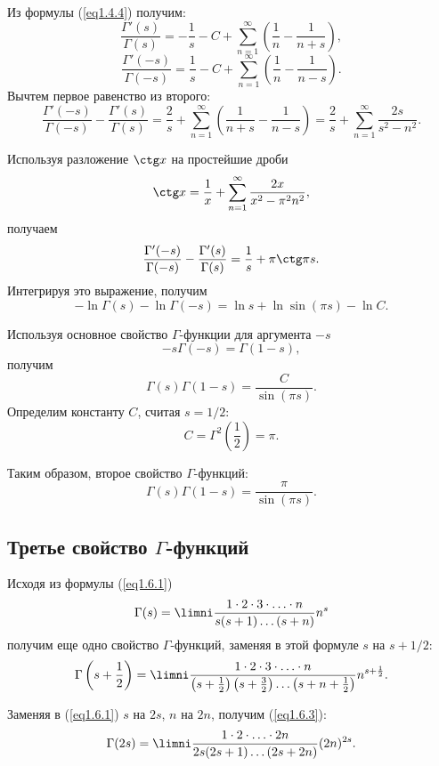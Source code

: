 Из формулы (\ref{eq1.4.4}) получим:
\[
    \frac{\Gamma'(s)}{\Gamma(s)} = -\frac{1}{s} - C + \sum\limits_{n=1}^\infty
    \left(\frac{1}{n} - \frac{1}{n+s}\right),
\]
\[
    \frac{\Gamma'(-s)}{\Gamma(-s)} = \frac{1}{s} - C + \sum\limits_{n=1}^\infty
    \left(\frac{1}{n} - \frac{1}{n-s}\right).
\]
Вычтем первое равенство из второго:
\[
    \frac{\Gamma'(-s)}{\Gamma(-s)} - \frac{\Gamma'(s)}{\Gamma(s)} =
    \frac{2}{s} + \sum\limits_{n=1}^\infty \left(\frac{1}{n+s} -
    \frac{1}{n-s}\right) = 
    \frac{2}{s} + \sum\limits_{n=1}^\infty \frac{2s}{s^2 - n^2}.
\]

Используя разложение \( \ctg x \) на простейшие дроби
\[
    \ctg x = \frac{1}{x} + \sum\limits_{n=1}^\infty \frac{2x}{x^2 - \pi^2n^2},
\]
получаем
\[
    \frac{\Gamma'(-s)}{\Gamma(-s)} - \frac{\Gamma'(s)}{\Gamma(s)} =
    \frac{1}{s} + \pi\ctg\pi s.
\]
Интегрируя это выражение, получим
\[
    -\ln\Gamma(s) - \ln\Gamma(-s) = \ln s + \ln\sin(\pi s) - \ln C.
\]

Используя основное свойство \( \Gamma \)-функции для аргумента \( -s \)
\[
    -s\Gamma(-s) = \Gamma(1-s),
\]
получим
\[
    \Gamma(s)\Gamma(1-s) = \frac{C}{\sin(\pi s)}.
\]
Определим константу \( C \), считая \( s = 1/2 \):
\[
    C = \Gamma^2\left(\frac{1}{2}\right) = \pi.
\]

Таким образом, второе свойство \( \Gamma \)-функций:
\begin{equation}
   \Gamma(s)\Gamma(1-s) = \frac{\pi}{\sin(\pi s)}.
   \label{eq1.5.1}
\end{equation}

\subsection{Третье свойство \( \Gamma \)-функций}

Исходя из формулы (\ref{eq1.6.1})
\begin{equation}
    \Gamma(s) =
    \limni\frac{1\cdot2\cdot3\cdot\ldots\cdot n}{s(s+1)\ldots(s+n)} n^s
    \label{eq1.6.1}
\end{equation}
получим еще одно свойство \( \Gamma \)-функций, заменяя в этой формуле \( s \)
на \( s + 1/2 \):
\begin{equation}
    \Gamma\left(s+\frac{1}{2}\right) =
    \limni\frac{1\cdot2\cdot3\cdot\ldots\cdot n}{
    \left(s + \frac{1}{2}\right) \left(s + \frac{3}{2}\right) \ldots
    \left(s + n + \frac{1}{2}\right)} n^{s+\frac{1}{2}}.
    \label{eq1.6.2}
\end{equation}

Заменяя в (\ref{eq1.6.1}) \( s \) на \( 2s \), \( n \) на \( 2n \), получим
(\ref{eq1.6.3}):
\begin{equation}
    \Gamma(2s) =
    \limni\frac{1\cdot2\cdot\ldots\cdot2n}{2s(2s+1)\ldots(2s+2n)}(2n)^{2s}.
    \label{eq1.6.3}
\end{equation}

